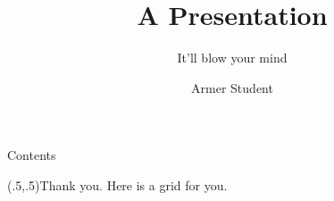 \documentclass[]{MRTbeam}
\title{A Presentation}
\subtitle{It'll blow your mind}
\author[A. Student]{Armer Student}
\begin{document}
\begingroup
\OnlyOneTopRuletrue
\begin{frame}%
\maketitle
\end{frame}%
\endgroup

\begin{frame}{Contents}{}%
\tableofcontents
\end{frame}%

\StartOfProgress



\EndOfProgress

\begin{whiteframes}
  \ShowGrid
  \begin{frame}{\relax}{\relax}%
    \PlaceAt(.5,.5){\Huge Thank you. Here is a grid for you.}
  \end{frame}%
\end{whiteframes}
\end{document}
